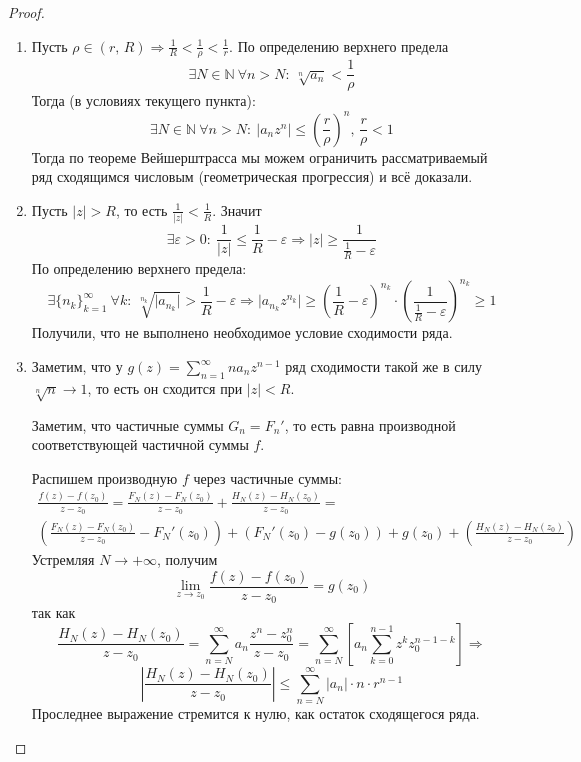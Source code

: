 \documentclass[a4paper,12pt]{article}
\renewcommand{\leq}{\ensuremath{\leqslant}}
\renewcommand{\geq}{\ensuremath{\geqslant}}
\theoremstyle{plain}
\theoremstyle{definition}
\theoremstyle{remark}
\begin{document}
\begin{proof}
	\begin{enumerate}
		\item Пусть $\rho \in (r,\, R) \Rightarrow \frac{1}{R} < \frac{1}{\rho} < \frac{1}{r}$. По определению верхнего предела
		      \[
			      \exists N \in \mathbb{N} \: \forall n > N :\: \sqrt[n]{a_n} < \frac{1}{\rho}
		      \]
		      Тогда (в условиях текущего пункта):
		      \[
			      \exists N \in \mathbb{N} \: \forall n > N :\: \vert a_nz^n\vert \leq \left(\frac{r}{\rho}\right)^n,\, \frac{r}{\rho} < 1
		      \]
		      Тогда по теореме Вейшерштрасса мы можем ограничить рассматриваемый ряд сходящимся числовым (геометрическая прогрессия) и всё доказали.
		\item Пусть $\vert z\vert > R$, то есть $\frac{1}{\vert z\vert} < \frac{1}{R}$. Значит
		      \[
			      \exists \varepsilon > 0 :\: \frac{1}{\vert z\vert} \leq \frac{1}{R} - \varepsilon \Rightarrow \vert z\vert \geq \frac{1}{\frac{1}{R} - \varepsilon}
		      \]
		      По определению верхнего предела:
		      \[
			      \exists \{n_k\}_{k = 1}^\infty \: \forall k :\: \sqrt[n_k]{\vert a_{n_k}\vert} > \frac{1}{R} - \varepsilon \Rightarrow \vert a_{n_k}z^{n_k}\vert \geq \left(\frac{1}{R} - \varepsilon\right)^{n_k}\cdot\left(\frac{1}{\frac{1}{R} - \varepsilon}\right)^{n_k} \geq 1
		      \]
		      Получили, что не выполнено необходимое условие сходимости ряда.
		\item Заметим, что у $g(z) = \sum_{n = 1}^\infty na_nz^{n-1}$ ряд сходимости такой же в силу $\sqrt[n]{n} \to 1$, то есть он сходится при $\vert z\vert < R$.

		      Заметим, что частичные суммы $G_n = F_n'$, то есть равна производной соответствующей частичной суммы $f$.

		      Распишем производную $f$ через частичные суммы:
		      \begin{align*}
			      \frac{f(z) - f(z_0)}{z - z_0} = \frac{F_N(z) - F_N(z_0)}{z - z_0} + \frac{H_N(z) - H_N(z_0)}{z - z_0} = \\
			      \left(\frac{F_N(z) - F_N(z_0)}{z - z_0}  - F_N'(z_0)\right) + (F_N'(z_0) - g(z_0)) + g(z_0) + \left(\frac{H_N(z) - H_N(z_0)}{z - z_0}\right)
		      \end{align*}
		      Устремляя $N \to +\infty$, получим
		      \[
			      \lim_{z \to z_0} \frac{f(z) - f(z_0)}{z - z_0} = g(z_0)
		      \]
		      так как
		      \[
			      \frac{H_N(z) - H_N(z_0)}{z - z_0} = \sum_{n = N}^\infty a_n\frac{z^n - z^n_0}{z - z_0} = \sum_{n = N}^\infty \left[a_n\sum_{k =0}^{n-1}z^kz_0^{n - 1 - k}\right] \Rightarrow
		      \]
		      \[
			      \left\vert\frac{H_N(z) - H_N(z_0)}{z - z_0}\right\vert \leq \sum_{n = N}^\infty \vert a_n\vert\cdot n\cdot r^{n - 1}
		      \]
		      Проследнее выражение стремится к нулю, как остаток сходящегося ряда.
	\end{enumerate}

\end{proof}
\end{document}
